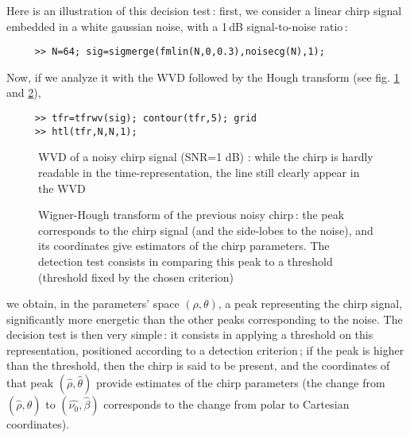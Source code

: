   Here is an illustration of this decision test\,: first, we consider
a linear chirp signal embedded in a white gaussian noise, with a 1\,dB 
signal-to-noise ratio\,:
\begin{verbatim}
     >> N=64; sig=sigmerge(fmlin(N,0,0.3),noisecg(N),1);
\end{verbatim}
Now, if we analyze it with the WVD followed by the Hough transform (see
fig. \ref{Ex1fig3} and \ref{Ex1fig4}),
\begin{verbatim}
     >> tfr=tfrwv(sig); contour(tfr,5); grid
     >> htl(tfr,N,N,1);
\end{verbatim}
\begin{figure}[htb]
\epsfxsize=10cm
\epsfysize=10cm
\centerline{}
\caption{\label{Ex1fig3}WVD of a noisy chirp signal (SNR=1 dB) : while the
chirp is hardly readable in the time-representation, the line still clearly
appear in the WVD}
\end{figure}
\begin{figure}[htb]
\epsfxsize=10cm
\epsfysize=8cm
\centerline{}
\caption{\label{Ex1fig4}Wigner-Hough transform of the previous noisy
chirp\,: the peak corresponds to the chirp signal (and the side-lobes to
the noise), and its coordinates give estimators of the chirp
parameters. The detection test consists in comparing this peak to a
threshold (threshold fixed by the chosen criterion)}
\end{figure}
we obtain, in the parameters' space $(\rho,\theta)$, a peak representing
the chirp signal, significantly more energetic than the other peaks
corresponding to the noise. The decision test is then very simple\,: it
consists in applying a threshold on this representation, positioned
according to a detection criterion\,; if the peak is higher than the
threshold, then the chirp is said to be present, and the coordinates of
that peak $(\hat{\rho},\hat{\theta})$ provide estimates of the chirp
parameters (the change from $(\hat{\rho},\hat{\theta})$ to
$(\hat{\nu_0},\hat{\beta})$ corresponds to the change from polar to
Cartesian coordinates).

